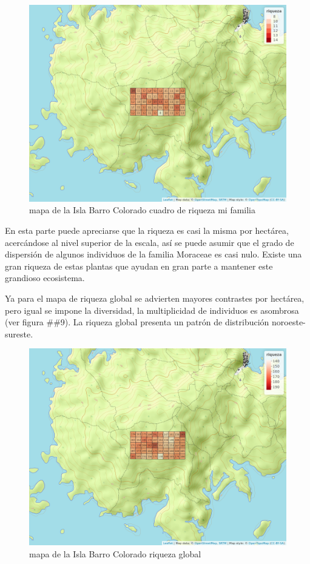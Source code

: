 \documentclass[11pt,]{article}
\begin{document}
\begin{figure}
\centering
\includegraphics[width=1.00000\textwidth]{mapa_cuadros_riq_mi_familia.png}
\caption{mapa de la Isla Barro Colorado cuadro de riqueza mi familia
\label{fig:bci_map}}
\end{figure}

En esta parte puede apreciarse que la riqueza es casi la misma por
hectárea, acercándose al nivel superior de la escala, así se puede
asumir que el grado de dispersión de algunos individuos de la familia
Moraceae es casi nulo. Existe una gran riqueza de estas plantas que
ayudan en gran parte a mantener este grandioso ecosistema.

Ya para el mapa de riqueza global se advierten mayores contrastes por
hectárea, pero igual se impone la diversidad, la multiplicidad de
individuos es asombrosa (ver figura \#\#9). La riqueza global presenta
un patrón de distribución noroeste-sureste.

\begin{figure}
\centering
\includegraphics[width=1.00000\textwidth]{mapa_cuadros_riq_global.png}
\caption{mapa de la Isla Barro Colorado riqueza global
\label{fig:bci_map}}
\end{figure}
\end{document}
